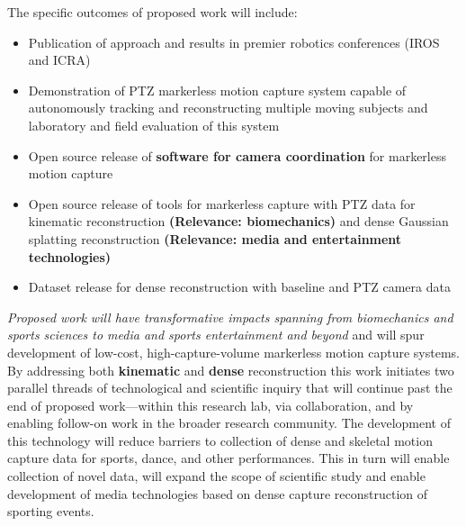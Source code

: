 \documentclass[11pt]{article}
\begin{document}
The specific outcomes of proposed work will include:
\begin{itemize}[itemsep=0.3ex,topsep=0.3ex]
  \item Publication of approach and results in premier robotics
    conferences (IROS and ICRA)
  \item Demonstration of PTZ markerless motion
    capture system capable of autonomously tracking and reconstructing multiple
    moving subjects and
    laboratory and field evaluation of this system
  \item Open source release of \textbf{software for camera coordination} for
    markerless motion capture
  \item Open source release of tools for markerless capture with PTZ data
    for kinematic reconstruction
    \textbf{(Relevance: biomechanics)} and dense Gaussian
    splatting reconstruction
    \textbf{(Relevance: media and entertainment technologies)}
  \item Dataset release for dense reconstruction with baseline and PTZ
    camera data
\end{itemize}
\emph{Proposed work will have transformative impacts spanning from
biomechanics and sports sciences to media and sports entertainment and beyond}
and will spur  development of low-cost, high-capture-volume markerless motion
capture systems.
By addressing both \textbf{kinematic} and \textbf{dense} reconstruction this
work initiates two parallel threads of technological and scientific inquiry that
will continue past the end of proposed work---within this research lab, via
collaboration, and by enabling follow-on work in the broader research community.
The development of this technology will reduce barriers to collection of dense
and skeletal motion capture data for sports, dance, and other performances.
This in turn will enable collection of novel data, will expand the scope of
scientific study and enable development of media technologies based on dense
capture reconstruction of sporting events.

\end{document}
